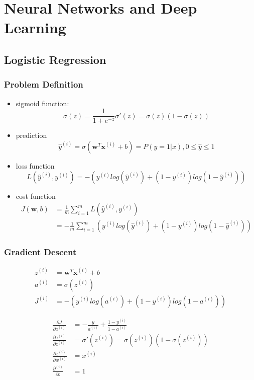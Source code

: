 \ifx\PREAMBLE\undefined


\fi

\chapter{Neural Networks and Deep Learning}
\section{Logistic Regression}
\subsection{Problem Definition}

\begin{itemize}
\item sigmoid function: 
\[\sigma(z)=\frac{1}{1+e^{-z}} \sigma'(z)=\sigma(z)(1-\sigma(z))\]
\item prediction
\[\hat{y}^{(i)}=\sigma(\mathbf{w}^T\mathbf{x}^{(i)} + b)=P(y=1|x), 0 \le \hat{y} \le 1\]
\item loss function
\[L(\hat{y}^{(i)}, y^{(i)})=-\left(y^{(i)}log(\hat{y}^{(i)})+(1-y^{(i)})log(1-\hat{y}^{(i)})\right)\]
\item cost function
\begin{align*}
J(\mathbf{w},b)&=\frac{1}{m}\displaystyle\sum_{i=1}^mL(\hat{y}^{(i)}, y^{(i)})\\
&=-\frac{1}{m}\displaystyle\sum_{i=1}^{m}\left(y^{(i)}log(\hat{y}^{(i)})+(1-y^{(i)})log(1-\hat{y}^{(i)})\right)
\end{align*}
\end{itemize}

\subsection{Gradient Descent}

\begin{align*}
z^{(i)} &= \mathbf{w}^T\mathbf{x}^{(i)}+b\\
a^{(i)} &= \sigma(z^{(i)})\\
J^{(i)} &= -\left(y^{(i)}log(a^{(i)})+(1-y^{(i)})log(1-a^{(i)})\right)
\end{align*}

\begin{align*}
\frac{\partial J}{\partial a^{(i)}}&=-\frac{y}{a^{(i)}}+\frac{1-y^{(i)}}{1-a^{(i)}}\\
\frac{\partial a^{(i)}}{\partial z^{(i)}}&=\sigma'(z^{(i)})=\sigma(z^{(i)})(1-\sigma(z^{(i)}))\\
\frac{\partial z^{(i)}}{\partial w^{(i)}}&=x^{(i)}\\
\frac{\partial ^{(i)}}{\partial b}&=1\\
\end{align*}

\ifx\PREAMBLE\undefined

\fi